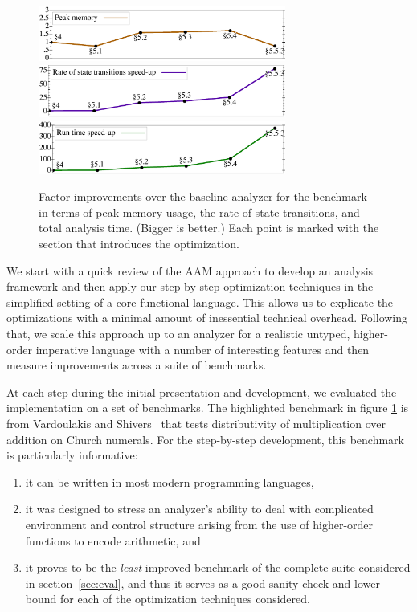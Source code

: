 \documentclass[preprint,onecolumn,9pt]{sigplanconf} %
\begin{document}
\begin{figure}[t]
\begin{center}
\includegraphics[width=3.2in]{church-relative-space}
\includegraphics[width=3.2in]{church-relative-speed}
\includegraphics[width=3.2in]{church-relative-time}
\vspace{-1.5em}
\end{center}
\caption{Factor improvements over the baseline analyzer for the
  \Church{} benchmark in terms of peak memory usage, the rate of state
  transitions, and total analysis time. (Bigger is better.) Each point
  is marked with the section that introduces the optimization.}
\label{fig:churchtime}
\end{figure}


We start with a quick review of the AAM approach to develop an
analysis framework and then apply our step-by-step optimization
techniques in the simplified setting of a core functional language.
This allows us to explicate the optimizations with a minimal amount of
inessential technical overhead.  Following that, we scale this
approach up to an analyzer for a realistic untyped, higher-order
imperative language with a number of interesting features and then
measure improvements across a suite of benchmarks.

At each step during the initial presentation and development, we
evaluated the implementation on a set of benchmarks. The highlighted
benchmark in figure \ref{fig:churchtime} is from Vardoulakis and
Shivers~\cite{dvanhorn:Vardoulakis2011CFA2} that tests distributivity
of multiplication over addition on Church numerals.  For the
step-by-step development, this benchmark is particularly informative:
\begin{enumerate}
\item it can be written in most modern programming languages,
%
\item it was designed to stress an analyzer's ability to deal with
  complicated environment and control structure arising from the use
  of higher-order functions to encode arithmetic, and
%
\item it proves to be the \emph{least} improved benchmark of the
  complete suite considered in section~\ref{sec:eval}, and thus it
  serves as a good sanity check and lower-bound for each of the
  optimization techniques considered.
\end{enumerate}
\end{document}
